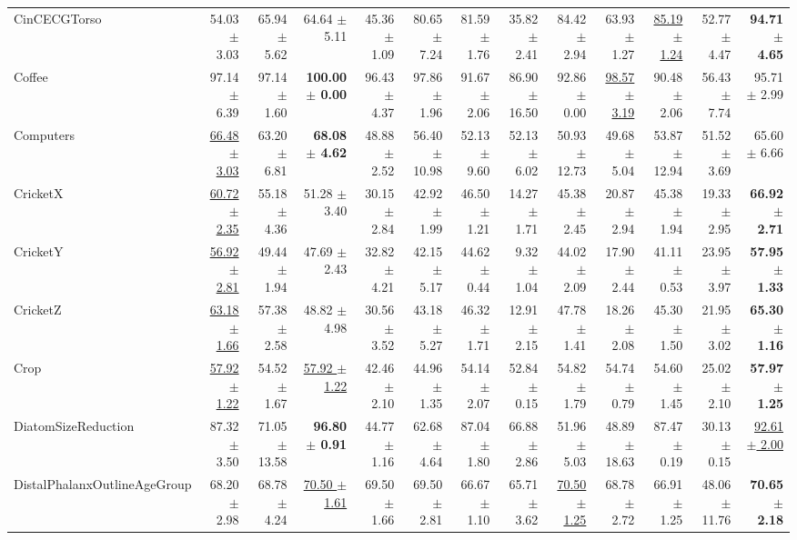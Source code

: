 \begin{landscape}
\begin{longtable}{lrrrrrrrrrrrr}
CinCECGTorso & 54.03 $\pm$ 3.03 & 65.94 $\pm$ 5.62 & 64.64 $\pm$ 5.11 & 45.36 $\pm$ 1.09 & 80.65 $\pm$ 7.24 & 81.59 $\pm$ 1.76 & 35.82 $\pm$ 2.41 & 84.42 $\pm$ 2.94 & 63.93 $\pm$ 1.27 & \underline{85.19 $\pm$ 1.24} & 52.77 $\pm$ 4.47 & \textbf{94.71 $\pm$ 4.65} \\
Coffee & 97.14 $\pm$ 6.39 & 97.14 $\pm$ 1.60 & \textbf{100.00 $\pm$ 0.00} & 96.43 $\pm$ 4.37 & 97.86 $\pm$ 1.96 & 91.67 $\pm$ 2.06 & 86.90 $\pm$ 16.50 & 92.86 $\pm$ 0.00 & \underline{98.57 $\pm$ 3.19} & 90.48 $\pm$ 2.06 & 56.43 $\pm$ 7.74 & 95.71 $\pm$ 2.99 \\
Computers & \underline{66.48 $\pm$ 3.03} & 63.20 $\pm$ 6.81 & \textbf{68.08 $\pm$ 4.62} & 48.88 $\pm$ 2.52 & 56.40 $\pm$ 10.98 & 52.13 $\pm$ 9.60 & 52.13 $\pm$ 6.02 & 50.93 $\pm$ 12.73 & 49.68 $\pm$ 5.04 & 53.87 $\pm$ 12.94 & 51.52 $\pm$ 3.69 & 65.60 $\pm$ 6.66 \\
CricketX & \underline{60.72 $\pm$ 2.35} & 55.18 $\pm$ 4.36 & 51.28 $\pm$ 3.40 & 30.15 $\pm$ 2.84 & 42.92 $\pm$ 1.99 & 46.50 $\pm$ 1.21 & 14.27 $\pm$ 1.71 & 45.38 $\pm$ 2.45 & 20.87 $\pm$ 2.94 & 45.38 $\pm$ 1.94 & 19.33 $\pm$ 2.95 & \textbf{66.92 $\pm$ 2.71} \\
CricketY & \underline{56.92 $\pm$ 2.81} & 49.44 $\pm$ 1.94 & 47.69 $\pm$ 2.43 & 32.82 $\pm$ 4.21 & 42.15 $\pm$ 5.17 & 44.62 $\pm$ 0.44 & 9.32 $\pm$ 1.04 & 44.02 $\pm$ 2.09 & 17.90 $\pm$ 2.44 & 41.11 $\pm$ 0.53 & 23.95 $\pm$ 3.97 & \textbf{57.95 $\pm$ 1.33} \\
CricketZ & \underline{63.18 $\pm$ 1.66} & 57.38 $\pm$ 2.58 & 48.82 $\pm$ 4.98 & 30.56 $\pm$ 3.52 & 43.18 $\pm$ 5.27 & 46.32 $\pm$ 1.71 & 12.91 $\pm$ 2.15 & 47.78 $\pm$ 1.41 & 18.26 $\pm$ 2.08 & 45.30 $\pm$ 1.50 & 21.95 $\pm$ 3.02 & \textbf{65.30 $\pm$ 1.16} \\
Crop & \underline{57.92 $\pm$ 1.22} & 54.52 $\pm$ 1.67 & \underline{57.92 $\pm$ 1.22} & 42.46 $\pm$ 2.10 & 44.96 $\pm$ 1.35 & 54.14 $\pm$ 2.07 & 52.84 $\pm$ 0.15 & 54.82 $\pm$ 1.79 & 54.74 $\pm$ 0.79 & 54.60 $\pm$ 1.45 & 25.02 $\pm$ 2.10 & \textbf{57.97 $\pm$ 1.25} \\
DiatomSizeReduction & 87.32 $\pm$ 3.50 & 71.05 $\pm$ 13.58 & \textbf{96.80 $\pm$ 0.91} & 44.77 $\pm$ 1.16 & 62.68 $\pm$ 4.64 & 87.04 $\pm$ 1.80 & 66.88 $\pm$ 2.86 & 51.96 $\pm$ 5.03 & 48.89 $\pm$ 18.63 & 87.47 $\pm$ 0.19 & 30.13 $\pm$ 0.15 & \underline{92.61 $\pm$ 2.00} \\
DistalPhalanxOutlineAgeGroup & 68.20 $\pm$ 2.98 & 68.78 $\pm$ 4.24 & \underline{70.50 $\pm$ 1.61} & 69.50 $\pm$ 1.66 & 69.50 $\pm$ 2.81 & 66.67 $\pm$ 1.10 & 65.71 $\pm$ 3.62 & \underline{70.50 $\pm$ 1.25} & 68.78 $\pm$ 2.72 & 66.91 $\pm$ 1.25 & 48.06 $\pm$ 11.76 & \textbf{70.65 $\pm$ 2.18} \\

\end{longtable}
\end{landscape}

